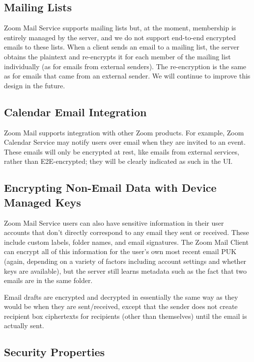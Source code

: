 \subsection{Mailing Lists}

Zoom Mail Service supports mailing lists but, at the moment, membership is entirely managed by the
server, and we do not support end-to-end encrypted emails to these lists. When a client sends an
email to a mailing list, the server obtains the plaintext and re-encrypts it for each member of the
mailing list individually (as for emails from external senders). The re-encryption is the same as
for emails that came from an external sender. We will continue to improve this design in the future.

\subsection{Calendar Email Integration}

Zoom Mail supports integration with other Zoom products. For example, Zoom Calendar Service may
notify users over email when they are invited to an event. These emails will only be encrypted at
rest, like emails from external services, rather than E2E-encrypted; they will be clearly indicated
as such in the UI.

\subsection{Encrypting Non-Email Data with Device Managed Keys}

Zoom Mail Service users can also have sensitive information in their user accounts that don't
directly correspond to any email they sent or received. These include custom labels, folder names,
and email signatures. The Zoom Mail Client can encrypt all of this information for the user's own
most recent email PUK (again, depending on a variety of factors including account settings and whether keys are available), but the server still learns metadata such as the fact that two emails are in
the same folder.

Email drafts are encrypted and decrypted in essentially the same way as they would be when they are
sent/received, except that the sender does not create recipient box ciphertexts for recipients
(other than themselves) until the email is actually sent.

\subsection{Security Properties}

